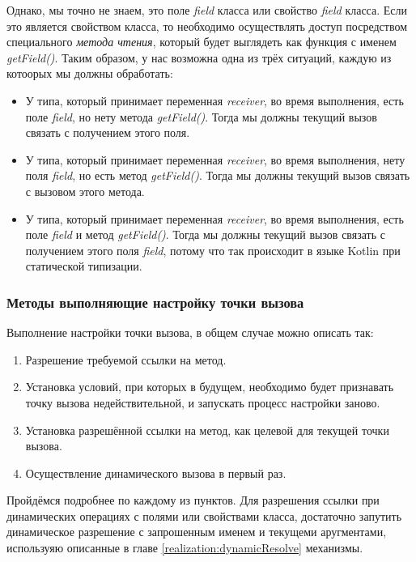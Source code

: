 Однако, мы точно не знаем, это поле \textit{field} класса или свойство \textit{field} класса. Если это является свойством класса, то необходимо осуществлять доступ посредством специального \textit{метода чтения}, который будет выглядеть как функция с именем \textit{getField()}. Таким образом, у нас возможна одна из трёх ситуаций, каждую из котоорых мы должны обработать:

\begin{itemize}
    \item У типа, который принимает переменная \textit{receiver}, во время выполнения, есть поле \textit{field}, но нету метода \textit{getField()}. Тогда мы должны текущий вызов связать с получением этого поля.
    \item У типа, который принимает переменная \textit{receiver}, во время выполнения, нету поля \textit{field}, но есть метод \textit{getField()}. Тогда мы должны текущий вызов связать с вызовом этого метода.
    \item У типа, который принимает переменная \textit{receiver}, во время выполнения, есть поле \textit{field} и метод \textit{getField()}. Тогда мы должны текущий вызов связать с получением этого поля \textit{field}, потому что так происходит в языке Kotlin при статической типизации.
\end{itemize}

\subsubsection{Методы выполняющие настройку точки вызова}

Выполнение настройки точки вызова, в общем случае можно описать так:

\begin{enumerate}
\item Разрешение требуемой ссылки на метод.
\item Установка условий, при которых в будущем, необходимо будет признавать точку вызова недействительной, и запускать процесс настройки заново.
\item Установка разрешённой ссылки на метод, как целевой для текущей точки вызова.
\item Осуществление динамического вызова в первый раз.
\end{enumerate}

Пройдёмся подробнее по каждому из пунктов. Для разрешения ссылки при динамических операциях с полями или свойствами класса, достаточно запутить динамическое разрешение с запрошенным именем и текущеми аругментами, используяю описанные в главе \ref{realization:dynamicResolve} механизмы.

